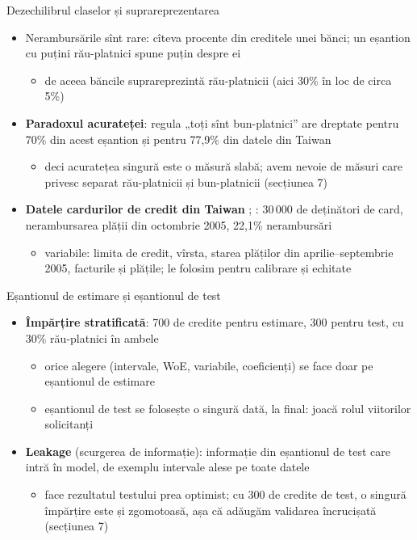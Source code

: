 \begin{frame}{Dezechilibrul claselor și suprareprezentarea}
\itemsize{\small}
\begin{itemize}
    \item Nerambursările sînt rare: cîteva procente din creditele unei bănci; un eșantion cu puțini rău-platnici spune puțin despre ei
    \begin{itemize}
        \item de aceea băncile suprareprezintă rău-platnicii (aici 30\% în loc de circa 5\%)
    \end{itemize}
    \item \textbf{Paradoxul acurateței}: regula „toți sînt bun-platnici” are dreptate pentru 70\% din acest eșantion și pentru 77{,}9\% din datele din Taiwan
    \begin{itemize}
        \item deci acuratețea singură este o măsură slabă; avem nevoie de măsuri care privesc separat rău-platnicii și bun-platnicii (secțiunea 7)
    \end{itemize}
    \item \textbf{Datele cardurilor de credit din Taiwan} ; : 30\,000 de deținători de card, nerambursarea plății din octombrie 2005, 22{,}1\% nerambursări
    \begin{itemize}
        \item variabile: limita de credit, vîrsta, starea plăților din aprilie--septembrie 2005, facturile și plățile; le folosim pentru calibrare și echitate
    \end{itemize}
\end{itemize}
\end{frame}

\begin{frame}{Eșantionul de estimare și eșantionul de test}
\itemsize{\small}
\begin{itemize}
    \item \textbf{Împărțire stratificată}: 700 de credite pentru estimare, 300 pentru test, cu 30\% rău-platnici în ambele
    \begin{itemize}
        \item orice alegere (intervale, WoE, variabile, coeficienți) se face doar pe eșantionul de estimare
        \item eșantionul de test se folosește o singură dată, la final: joacă rolul viitorilor solicitanți
    \end{itemize}
    \item \textbf{Leakage} (scurgerea de informație): informație din eșantionul de test care intră în model, de exemplu intervale alese pe toate datele
    \begin{itemize}
        \item face rezultatul testului prea optimist; cu 300 de credite de test, o singură împărțire este și zgomotoasă, așa că adăugăm validarea încrucișată (secțiunea 7)
    \end{itemize}
\end{itemize}
\end{frame}


